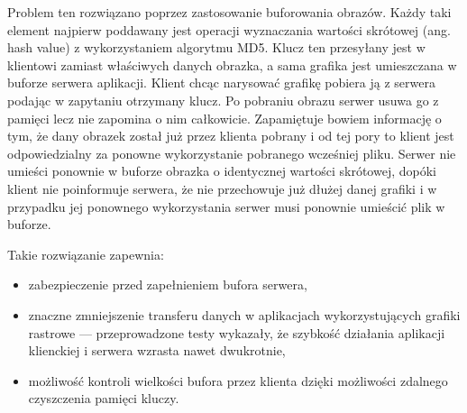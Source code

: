 Problem ten rozwiązano poprzez zastosowanie buforowania obrazów. Każdy taki element najpierw poddawany jest operacji wyznaczania wartości skrótowej (ang. hash value) z wykorzystaniem algorytmu MD5. Klucz ten przesyłany jest w klientowi zamiast właściwych danych obrazka, a sama grafika jest umieszczana w buforze serwera aplikacji. Klient chcąc narysować grafikę pobiera ją z serwera podając w zapytaniu otrzymany klucz. Po pobraniu obrazu serwer usuwa go z pamięci lecz nie zapomina o nim całkowicie. Zapamiętuje bowiem informację o tym, że dany obrazek został już przez klienta pobrany i od tej pory to klient jest odpowiedzialny za ponowne wykorzystanie pobranego wcześniej pliku. Serwer nie umieści ponownie w buforze obrazka o identycznej wartości skrótowej, dopóki klient nie poinformuje serwera, że nie przechowuje już dłużej danej grafiki i w przypadku jej ponownego wykorzystania serwer musi ponownie umieścić plik w buforze. 

Takie rozwiązanie zapewnia:
\begin{itemize}
\item zabezpieczenie przed zapełnieniem bufora serwera,
\item znaczne zmniejszenie transferu danych w aplikacjach wykorzystujących grafiki rastrowe --- przeprowadzone testy wykazały, że szybkość działania aplikacji klienckiej i serwera wzrasta nawet dwukrotnie,
\item możliwość kontroli wielkości bufora przez klienta dzięki możliwości zdalnego czyszczenia pamięci kluczy.
\end{itemize}